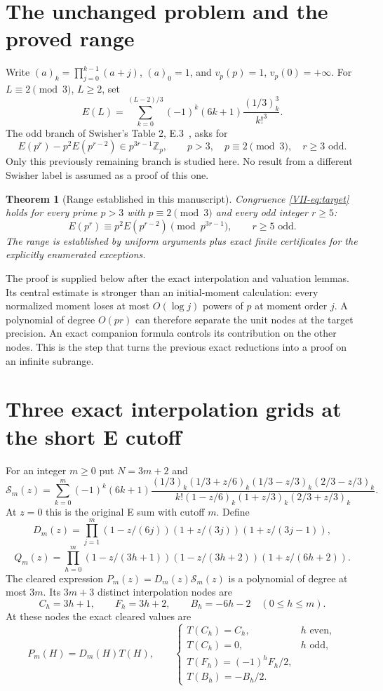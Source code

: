 \documentclass[11pt,letterpaper]{article}
\newtheorem{theorem}{Theorem}[section]
\numberwithin{equation}{section}
\begin{document}
\section{The unchanged problem and the proved range}\label{loc-VII-1}
Write $(a)_k=\prod_{j=0}^{k-1}(a+j)$, $(a)_0=1$, and
$v_p(p)=1$, $v_p(0)=+\infty$. For $L\equiv2\pmod3$, $L\ge2$, set
\[
 E(L)=\sum_{k=0}^{(L-2)/3}(-1)^k(6k+1)
       \frac{(1/3)_k^3}{k!^3}.
\]
The odd branch of Swisher's Table 2, E.3~\cite{VII-Swisher}, asks for
\begin{equation}\label{VII-eq:target}
 E(p^r)-p^2E(p^{r-2})\in p^{3r-1}\mathbb Z_p,
 \qquad p>3,\quad p\equiv2\pmod3,\quad r\ge3\text{ odd}.
\end{equation}
Only this previously remaining branch is studied here. No result
from a different Swisher label is assumed as a proof of this one.

\begin{theorem}[Range established in this manuscript]\label{VII-thm:main-range}
Congruence \eqref{VII-eq:target} holds for every prime $p>3$ with
$p\equiv2\pmod3$ and every odd integer $r\ge5$:
\[
 \boxed{E(p^r)\equiv p^2E(p^{r-2})\pmod{p^{3r-1}},\qquad r\ge5\text{ odd}.}
\]
The range is established by uniform arguments plus exact finite
certificates for the explicitly enumerated exceptions.
\end{theorem}

The proof is supplied below after the exact interpolation and
valuation lemmas. Its central estimate is stronger than an
initial-moment calculation: every normalized moment loses at most
$O(\log j)$ powers of $p$ at moment order $j$. A polynomial of
degree $O(pr)$ can therefore separate the unit nodes at the target
precision. An exact companion formula controls its contribution
on the other nodes. This is the step that turns the previous
exact reductions into a proof on an infinite subrange.

\section{Three exact interpolation grids at the short E cutoff}\label{loc-VII-2}
\label{VII-sec:E6models}
For an integer $m\ge0$ put $N=3m+2$ and
\[
 \mathcal S_m(z)=\sum_{k=0}^{m}(-1)^k(6k+1)
 \frac{(1/3)_k(1/3+z/6)_k(1/3-z/3)_k(2/3-z/3)_k}
 {k!(1-z/6)_k(1+z/3)_k(2/3+z/3)_k}.
\]
At $z=0$ this is the original E sum with cutoff $m$.
Define
\[
 D_m(z)=\prod_{j=1}^{m}
 (1-z/(6j))(1+z/(3j))(1+z/(3j-1)),
\]
\[
 Q_m(z)=\prod_{h=0}^{m}
 (1-z/(3h+1))(1-z/(3h+2))(1+z/(6h+2)).
\]
The cleared expression $P_m(z)=D_m(z)\mathcal S_m(z)$ is a
polynomial of degree at most $3m$. Its $3m+3$ distinct interpolation
nodes are
\[
 C_h=3h+1,\qquad F_h=3h+2,\qquad B_h=-6h-2
 \quad(0\le h\le m).
\]
At these nodes the exact cleared values are
\begin{equation}\label{VII-E6:models}
 P_m(H)=D_m(H)T(H),\qquad
 \begin{cases}
 T(C_h)=C_h,&h\text{ even},\\
 T(C_h)=0,&h\text{ odd},\\
 T(F_h)=(-1)^hF_h/2,\\
 T(B_h)=-B_h/2.
 \end{cases}
\end{equation}
\end{document}
